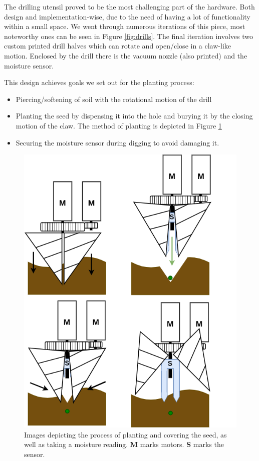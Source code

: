 \documentclass{article}
\begin{document}
The drilling utensil proved to be the most challenging part of the hardware. Both design and implementation-wise, due to the need of having a lot of functionality within a small space. We went through numerous iterations of this piece, most noteworthy ones can be seen in Figure \ref{fig:drills}. The final iteration involves two custom printed drill halves which can rotate and open/close in a claw-like motion. Enclosed by the drill there is the vacuum nozzle (also printed) and the moisture sensor. 



This design achieves goals we set out for the planting process:
\begin{itemize}
\vspace{-1mm}
\item Piercing/softening of soil with the rotational motion of the drill
\item Planting the seed by dispensing it into the hole and burying it by the closing motion of the claw. The method of planting is depicted in Figure \ref{fig:method}
\item Securing the moisture sensor during digging to avoid damaging it.
\end{itemize}
\vspace{-5mm}

\begin{figure}[h]
\begin{center}

\includegraphics[width=0.6\linewidth]{figs-demo3/method.png}

\caption{Images depicting the process of planting and covering the seed, as well as taking a moisture reading. \textbf{M} marks motors. \textbf{S} marks the sensor.  }
\label{fig:method}
\end{center}
\vskip -4mm
\end{figure} 
\end{document}
